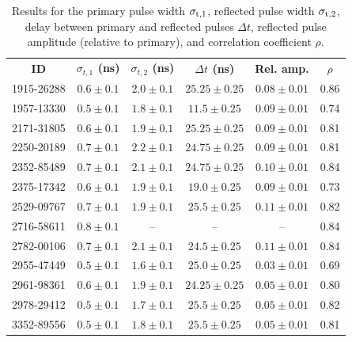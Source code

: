 \documentclass[amsmath,amssymb,aps,prd,10pt,twocolumn,showkeys]{revtex4}
\begin{document}
\begin{table}
\centering
\begin{tabular}{| c | c | c | c | c | c |}
\hline
\textbf{ID} & \textbf{$\sigma_{t,1}$ (ns)} & \textbf{$\sigma_{t,2}$ (ns)} & \textbf{$\Delta t$ (ns)} & \textbf{Rel. amp.} & \textbf{$\rho$} \\
1915-26288 & $0.6\pm 0.1$ & $2.0\pm 0.1$ & $25.25\pm 0.25$ & $0.08\pm 0.01$ & 0.86 \\
1957-13330 & $0.5\pm 0.1$ & $1.8\pm 0.1$ & $11.5\pm 0.25$ & $0.09\pm 0.01$ & 0.74 \\
2171-31805 & $0.6\pm 0.1$ & $1.9\pm 0.1$ & $25.25\pm 0.25$ & $0.09\pm 0.01$ & 0.81 \\
2250-20189 & $0.7\pm 0.1$ & $2.2\pm 0.1$ & $24.75\pm 0.25$ & $0.09\pm 0.01$ & 0.81 \\
2352-85489 & $0.7\pm 0.1$ & $2.1\pm 0.1$ & $24.75\pm 0.25$ & $0.10\pm 0.01$ & 0.84 \\
2375-17342 & $0.6\pm 0.1$ & $1.9\pm 0.1$ & $19.0\pm 0.25$ & $0.09\pm 0.01$ & 0.73 \\
2529-09767 & $0.7\pm 0.1$ & $1.9\pm 0.1$ & $25.5\pm 0.25$ & $0.11\pm 0.01$ & 0.82 \\
2716-58611 & $0.8\pm 0.1$ & -- & -- & -- & 0.84 \\
2782-00106 & $0.7\pm 0.1$ & $2.1\pm 0.1$ & $24.5\pm 0.25$ & $0.11\pm 0.01$ & 0.84 \\
2955-47449 & $0.5\pm 0.1$ & $1.6\pm 0.1$ & $25.0\pm 0.25$ & $0.03\pm 0.01$ & 0.69 \\
2961-98361 & $0.6\pm 0.1$ & $1.9\pm 0.1$ & $24.25\pm 0.25$ & $0.05\pm 0.01$ & 0.80 \\
2978-29412 & $0.5\pm 0.1$ & $1.7\pm 0.1$ & $25.5\pm 0.25$ & $0.05\pm 0.01$ & 0.82 \\
3352-89556 & $0.5\pm 0.1$ & $1.8\pm 0.1$ & $25.5\pm 0.25$ & $0.05\pm 0.01$ & 0.81 \\
\hline
\end{tabular}
\caption{\label{tab:results} Results for the primary pulse width $\sigma_{\rm t,1}$, reflected pulse width $\sigma_{\rm t,2}$, delay between primary and reflected pulses $\Delta t$, reflected pulse amplitude (relative to primary), and correlation coefficient $\rho$.}
\end{table}
\end{document}

